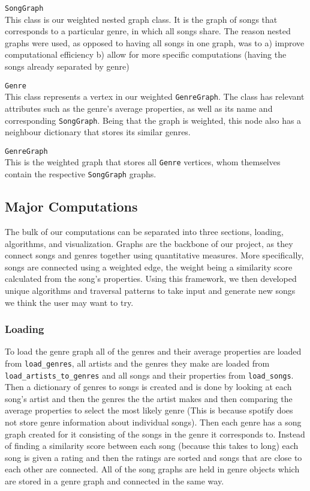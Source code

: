 \documentclass[fontsize=11pt]{article}
\begin{document}
    \noindent \texttt{SongGraph} \\
    This class is our weighted nested graph class. It is the graph of songs that corresponds to a particular genre, in which all songs share. The reason nested graphs were used, as opposed to having all songs in one graph, was to a) improve computational efficiency b) allow for more specific computations (having the songs already separated by genre) \\ \noindent

    \noindent\texttt{Genre} \\
    This class represents a vertex in our weighted \texttt{GenreGraph}. The class has relevant attributes such as the genre's average properties, as well as its name and corresponding \texttt{SongGraph}. Being that the graph is weighted, this node also has a neighbour dictionary that stores its similar genres. \\ \noindent

    \noindent \texttt{GenreGraph} \\
    This is the weighted graph that stores all \texttt{Genre} vertices, whom themselves contain the respective \texttt{SongGraph} graphs.

    \subsection*{Major Computations}
    The bulk of our computations can be separated into three sections, loading, algorithms, and visualization.
    \vspace{4mm} Graphs are the backbone of our project, as they connect songs and genres together using quantitative measures. More specifically, songs are connected using a weighted edge, the weight being a similarity score calculated from the song's properties. Using this framework, we then developed unique algorithms and traversal patterns to take input and generate new songs we think the user may want to try.
    \subsubsection*{Loading}
    To load the genre graph all of the genres and their average properties are loaded from \texttt{load\_genres}, all artists and the genres they make are loaded from \texttt{load\_artists\_to\_genres} and all songs and their properties from \texttt{load\_songs}. Then a dictionary of genres to songs is created and is done by looking at each song's artist and then the genres the the artist makes and then comparing the average properties to select the most likely genre (This is because spotify does not store genre information about individual songs). Then each genre has a song graph created for it consisting of the songs in the genre it corresponds to. Instead of finding a similarity score between each song (because this takes to long) each song is given a rating and then the ratings are sorted and songs that are close to each other are connected. All of the song graphs are held in genre objects which are stored in a genre graph and connected in the same way.
\end{document}
